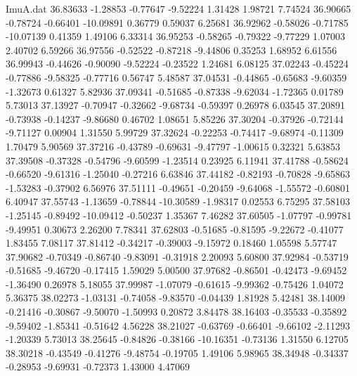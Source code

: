 \begin{filecontents}{ImuA.dat}
  36.83633   -1.28853   -0.77647   -9.52224    1.31428    1.98721    7.74524
  36.90665   -0.78724   -0.66401  -10.09891    0.36779    0.59037    6.25681
  36.92962   -0.58026   -0.71785  -10.07139    0.41359    1.49106    6.33314
  36.95253   -0.58265   -0.79322   -9.77229    1.07003    2.40702    6.59266
  36.97556   -0.52522   -0.87218   -9.44806    0.35253    1.68952    6.61556
  36.99943   -0.44626   -0.90090   -9.52224   -0.23522    1.24681    6.08125
  37.02243   -0.45224   -0.77886   -9.58325   -0.77716    0.56747    5.48587
  37.04531   -0.44865   -0.65683   -9.60359   -1.32673    0.61327    5.82936
  37.09341   -0.51685   -0.87338   -9.62034   -1.72365    0.01789    5.73013
  37.13927   -0.70947   -0.32662   -9.68734   -0.59397    0.26978    6.03545
  37.20891   -0.73938   -0.14237   -9.86680    0.46702    1.08651    5.85226
  37.30204   -0.37926   -0.72144   -9.71127    0.00904    1.31550    5.99729
  37.32624   -0.22253   -0.74417   -9.68974   -0.11309    1.70479    5.90569
  37.37216   -0.43789   -0.69631   -9.47797   -1.00615    0.32321    5.63853
  37.39508   -0.37328   -0.54796   -9.60599   -1.23514    0.23925    6.11941
  37.41788   -0.58624   -0.66520   -9.61316   -1.25040   -0.27216    6.63846
  37.44182   -0.82193   -0.70828   -9.65863   -1.53283   -0.37902    6.56976
  37.51111   -0.49651   -0.20459   -9.64068   -1.55572   -0.60801    6.40947
  37.55743   -1.13659   -0.78844  -10.30589   -1.98317    0.02553    6.75295
  37.58103   -1.25145   -0.89492  -10.09412   -0.50237    1.35367    7.46282
  37.60505   -1.07797   -0.99781   -9.49951    0.30673    2.26200    7.78341
  37.62803   -0.51685   -0.81595   -9.22672   -0.41077    1.83455    7.08117
  37.81412   -0.34217   -0.39003   -9.15972    0.18460    1.05598    5.57747
  37.90682   -0.70349   -0.86740   -9.83091   -0.31918    2.20093    5.60800
  37.92984   -0.53719   -0.51685   -9.46720   -0.17415    1.59029    5.00500
  37.97682   -0.86501   -0.42473   -9.69452   -1.36490    0.26978    5.18055
  37.99987   -1.07079   -0.61615   -9.99362   -0.75426    1.04072    5.36375
  38.02273   -1.03131   -0.74058   -9.83570   -0.04439    1.81928    5.42481
  38.14009   -0.21416   -0.30867   -9.50070   -1.50993    0.20872    3.84478
  38.16403   -0.35533   -0.35892   -9.59402   -1.85341   -0.51642    4.56228
  38.21027   -0.63769   -0.66401   -9.66102   -2.11293   -1.20339    5.73013
  38.25645   -0.84826   -0.38166  -10.16351   -0.73136    1.31550    6.12705
  38.30218   -0.43549   -0.41276   -9.48754   -0.19705    1.49106    5.98965
  38.34948   -0.34337   -0.28953   -9.69931   -0.72373    1.43000    4.47069

\end{filecontents}
